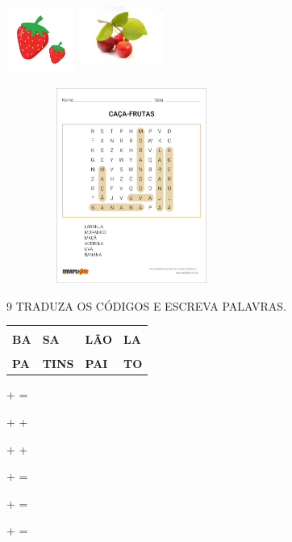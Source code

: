 \includegraphics[width=0.89097in,height=0.85417in]{media/image102.jpg}
\includegraphics[width=1.07847in,height=0.97917in]{media/image103.jpg}



\includegraphics[width=3.23199in,height=2.51443in]{media/image104.jpg}

\num{9} TRADUZA OS CÓDIGOS E ESCREVA PALAVRAS.

\begin{longtable}[]{@{}llll@{}}
\toprule
& & &\tabularnewline
\textbf{BA} & \textbf{SA} & \textbf{LÃO} & \textbf{LA}\tabularnewline
& & &\tabularnewline
\textbf{PA} & \textbf{TINS} & \textbf{PAI} & \textbf{TO}\tabularnewline
\bottomrule
\end{longtable}

\begin{escolha}
\item + = 

\item + + 

\item + + 

\item + = 

\item + = 

\item + = 
\end{escolha}

